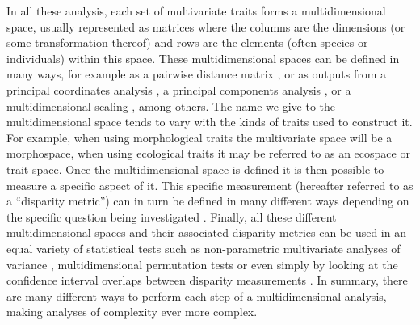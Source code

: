 \documentclass[12pt,letterpaper]{article}
\begin{document}
In all these analysis, each set of multivariate traits forms a multidimensional space, usually represented as matrices where the columns are the dimensions (or some transformation thereof) and rows are the elements (often species or individuals) within this space.
These multidimensional spaces can be defined in many ways, for example as a pairwise distance matrix \citep{Close2015}, or as outputs from a principal coordinates analysis \citep[PCO;][]{Brusatte12092008}, a principal components analysis \citep[PCA;][]{zelditch2012geometric}, or a multidimensional scaling \citep[MDS;][]{DonohueDim}, among others.
The name we give to the multidimensional space tends to vary with the kinds of traits used to construct it. 
For example, when using morphological traits the multivariate space will be a morphospace, when using ecological traits it may be referred to as an ecospace or trait space.
Once the multidimensional space is defined it is then possible to measure a specific aspect of it.
This specific measurement (hereafter referred to as a ``disparity metric'') can in turn be defined in many different ways depending on the specific question being investigated \citep[e.g.][or combinations thereof]{Wills2001,Ciampaglio2001,foth2012different,DonohueDim,Hughes20082013,finlay2015morphological,Close2015}.
Finally, all these different multidimensional spaces and their associated disparity metrics can be used in an equal variety of statistical tests such as non-parametric multivariate analyses of variance \citep[e.g.][]{Brusatte12092008}, multidimensional permutation tests \citep[e.g.][]{diaz2016global} or even simply by looking at the confidence interval overlaps between disparity measurements \citep[e.g.][]{halliday2016eutherian}.
In summary, there are many different ways to perform each step of a multidimensional analysis, making analyses of complexity ever more complex.
\end{document}
